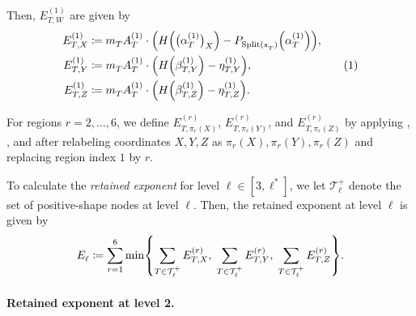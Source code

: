 \documentclass[11pt, a4paper, copyright, gdm]{google}
\theoremstyle{definition}
\theoremstyle{remark}
\theoremstyle{plain}
\DeclareMathOperator{\Split}{Split}
\newcommand{\defeq}{\coloneqq}
\DeclarePairedDelimiter{\bk}{(}{)}
\DeclarePairedDelimiter{\BK}{\{}{\}}
\newcommand{\numberthis}{\addtocounter{equation}{1}\tag{\theequation}}
\begin{document}
Then, $E^{(1)}_{T,W}$ are given by
\[
  \begin{aligned}
    E_{T,X}^{(1)}
     & \defeq
    m_T^{} A_T^{(1)} \cdot
    \bk[\Big]{
      H\bk*{\bk[\big]{\alpha_{T}^{(1)}}_{X}^{}}
      - P_{\Split(s_T^{})}^{}\bk*{\alpha_T^{(1)}}
    },        \\
    E_{T,Y}^{(1)}
     & \defeq
    m_T^{} A_T^{(1)} \cdot
    \bk[\Big]{
      H\bk*{\beta_{T,Y}^{(1)}}
      - \eta_{T,Y}^{(1)}
    },        \\
    E_{T,Z}^{(1)}
     & \defeq
    m_T^{} A_T^{(1)} \cdot
    \bk[\Big]{
      H\bk*{\beta_{T,Z}^{(1)}}
      - \eta_{T,Z}^{(1)}
    }.
  \end{aligned}
  \numberthis \label{eq:E-positive-shape}
\]

For regions $r = 2, \dots, 6$, we define $E_{T,\pi_r^{}(X)}^{(r)}$, $E_{T,\pi_r^{}(Y)}^{(r)}$, and $E_{T,\pi_r^{}(Z)}^{(r)}$ by applying
, , and  after relabeling coordinates $X,Y,Z$ as $\pi_r^{}(X),\pi_r^{}(Y),\pi_r^{}(Z)$ and replacing region index $1$ by $r$.

To calculate the \emph{retained exponent} for level $\ell \in [3, \ell^*]$, we let $\mathcal T_\ell^+$ denote the set of positive-shape nodes at level $\ell$. Then, the retained exponent at level $\ell$ is given by
\[
  E_\ell^{}
  \defeq
  \sum_{r = 1}^6
  \min\BK*{
    \sum_{T \in \mathcal T_\ell^+} E_{T,X}^{(r)}, \;
    \sum_{T \in \mathcal T_\ell^+} E_{T,Y}^{(r)}, \;
    \sum_{T \in \mathcal T_\ell^+} E_{T,Z}^{(r)}
  }.
\]

\paragraph{Retained exponent at level 2.}
\end{document}
